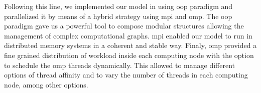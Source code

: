 {Following this line, we implemented our model in  using \gls{oop} paradigm and parallelized it by means of a hybrid strategy using \gls{mpi} and \gls{omp}. The \gls{oop} paradigm gave us a powerful tool to compose modular structures allowing the management of complex computational graphs. \gls{mpi} enabled our model to run in distributed memory systems in a coherent and stable way. Finaly, \gls{omp} provided a fine grained distribution of  workload inside each computing node with the option to schedule the \gls{omp} threads dynamically. This allowed to manage different options of thread affinity and to vary the number of threads in each computing node, among other options.
}
























